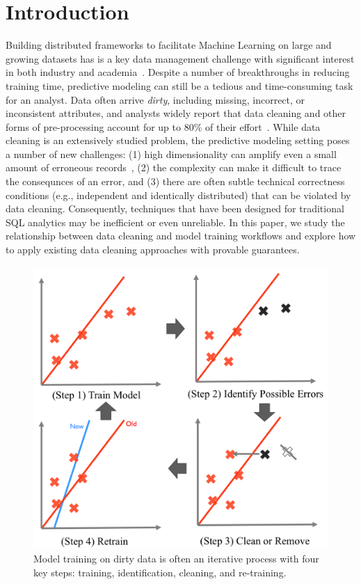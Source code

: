 \section{Introduction}
Building distributed frameworks to facilitate Machine Learning on large and growing datasets has is a key data management challenge with significant interest in both industry and academia~\cite{bdas, alexandrov2014stratosphere, crotty2014tupleware, tensor}.
Despite a number of breakthroughs in reducing training time, predictive modeling can still be a tedious and time-consuming task for an analyst. 
Data often arrive \emph{dirty}, including missing, incorrect, or inconsistent attributes, and analysts widely report that data cleaning and other forms of pre-processing account for up to 80\% of their effort~\cite{nytimes, kandel2012}.
While data cleaning is an extensively studied problem, the predictive modeling setting poses a number of new challenges: (1) high dimensionality can amplify even a small amount of erroneous records~\cite{xiaofeature}, (2) the complexity can make it difficult to trace the consequnces of an error, and (3) there are often subtle technical correctness conditions (e.g., independent and identically distributed) that can be violated by data cleaning.
Consequently, techniques that have been designed for traditional SQL analytics may be inefficient or even unreliable.
In this paper, we study the relationship between data cleaning and model training workflows and explore how to apply existing data cleaning approaches with provable guarantees.

\begin{figure}[t]
\centering
 \includegraphics[width=0.8\columnwidth]{figs/update-arch4.png}
 \caption{Model training on dirty data is often an iterative process with four key steps: training, identification, cleaning, and re-training. \label{teaser}}\vspace{-1.5em}
\end{figure}

